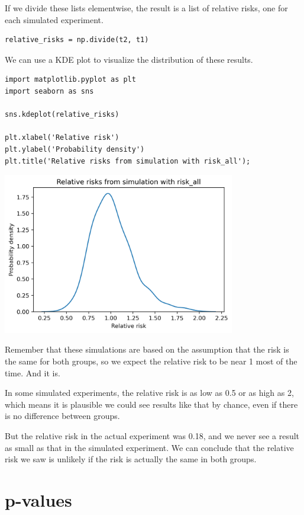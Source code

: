 If we divide these lists elementwise, the result is a list of relative
risks, one for each simulated experiment.

\begin{lstlisting}[]
relative_risks = np.divide(t2, t1)
\end{lstlisting}

We can use a KDE plot to visualize the distribution of these results.

\begin{lstlisting}[]
import matplotlib.pyplot as plt
import seaborn as sns

sns.kdeplot(relative_risks)

plt.xlabel('Relative risk')
plt.ylabel('Probability density')
plt.title('Relative risks from simulation with risk_all');
\end{lstlisting}

\begin{center}
\includegraphics[width=4in]{13_hypothesis_files/13_hypothesis_28_0.png}
\end{center}

Remember that these simulations are based on the assumption that the
risk is the same for both groups, so we expect the relative risk to be
near 1 most of the time. And it is.

In some simulated experiments, the relative risk is as low as 0.5 or as
high as 2, which means it is plausible we could see results like that by
chance, even if there is no difference between groups.

But the relative risk in the actual experiment was 0.18, and we never
see a result as small as that in the simulated experiment. We can
conclude that the relative risk we saw is unlikely if the risk is
actually the same in both groups.

\hypertarget{p-values}{%
\section{p-values}\label{p-values}}

